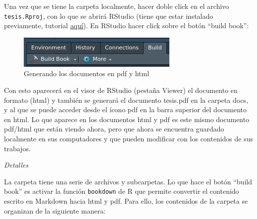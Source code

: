 \documentclass[12pt,twoside]{templates/facsothesis}
\begin{document}
Una vez que se tiene la carpeta localmente, hacer doble click en el archivo \texttt{tesis.Rproj}, con lo que se abrirá RStudio (tiene que estar instalado previamente, tutorial \href{https://multivariada.netlify.app/class/\#installR}{aquí}). En RStudio hacer click sobre el botón ``build book'':

\begin{figure}

{\centering \includegraphics[width=0.6\linewidth]{images/build_book} 

}

\caption{Generando los documentos en pdf y html}\label{fig:build}
\end{figure}

Con esto aparecerá en el visor de RStudio (pestaña Viewer) el documento en formato (html) y también se generará el documento tesis.pdf en la carpeta docs, y al que se puede acceder desde el ícono pdf en la barra superior del documento en html. Lo que aparece en los documentos html y pdf es este mismo documento pdf/html que están viendo ahora, pero que ahora se encuentra guardado localmente en sus computadores y que pueden modificar con los contenidos de sus trabajos.

\emph{Detalles}

La carpeta tiene una serie de archivos y subcarpetas. Lo que hace el botón ``build book'' es activar la función \texttt{bookdown} de R que permite convertir el contenido escrito en Markdown hacia html y pdf. Para ello, los contenidos de la carpeta se organizan de la siguiente manera:
\end{document}
